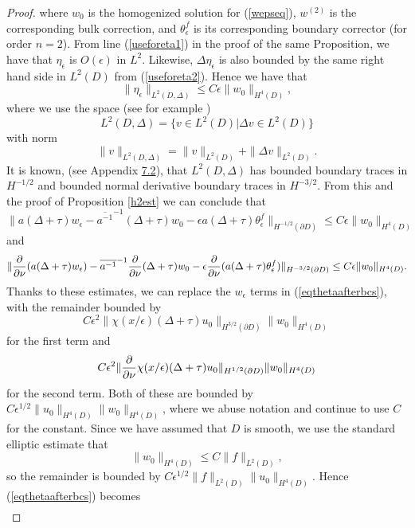 \documentclass[10pt,a4paper]{amsart}
\begin{document}
\begin{proof}
where $w_0$ is the homogenized solution for (\ref{wepseq}), $w^{(2)}$ is the corresponding bulk correction, and $\theta^f_\epsilon$ is its corresponding boundary corrector (for order $n=2$). 
From line (\ref{useforeta1}) in the proof of the same Proposition, we have that $\eta_\epsilon$ is $O(\epsilon)$ in $L^2$. Likewise, $ \Delta \eta_\epsilon $  is also  bounded by the same right hand side in $L^2(D)$ from (\ref{useforeta2}).  Hence we have that 
$$ \|  \eta_\epsilon \|_{L^2(D,\Delta)} \leq  C\epsilon \| w_0\|_{H^4( D)}, $$
where we use the space (see for example \cite{Va})  $$L^2(D, \Delta) = \{ v \in L^2(D)| \Delta v\in L^2(D)\}  $$ with norm $$ \| v\|_{L^2(D,\Delta)} = \|v\|_{L^2(D)} + \| \Delta v \|_{L^2(D)}.$$ It is known, (see Appendix \href{https://arxiv.org/abs/2508.21174v1}{7.2}), that $L^2(D,\Delta)$ has bounded boundary traces in $H^{-1/2}$ and bounded normal derivative boundary traces in $H^{-3/2}$. From this and the proof of Proposition \ref{h2est} we can conclude that 
\begin{equation}\label{hminushalfest} \|a (\Delta+\tau)w_\epsilon -\overline{a^{-1}}^{-1}(\Delta +\tau)w_0 -\epsilon a (\Delta+\tau)\theta^f_\epsilon \|_{H^{-1/2}(\partial D)} \leq C\epsilon \| w_0\|_{H^4( D)} \end{equation} and 
\begin{equation}\label{hminus3halfest} \| {\partial\over{\partial\nu}} (a(\Delta+\tau)w_\epsilon) -\overline{a^{-1}}^{-1}{\partial\over{\partial\nu}}(\Delta +\tau)w_0 -\epsilon {\partial\over{\partial\nu}} (a (\Delta+\tau)\theta^f_\epsilon) \|_{H^{-3/2}(\partial D)} \leq C\epsilon \| w_0\|_{H^4( D)}. \end{equation}
Thanks to these estimates, we can replace the $w_\epsilon$ terms in (\ref{eqthetaafterbcs}), with the remainder bounded by $$C \epsilon^2 \| \chi(x/\epsilon)(\Delta + \tau) u_0 \|_{H^{3/2}(\partial D)}   \| w_0\|_{H^4(D)}$$ for the first term and  $$ C \epsilon^2 \| {\partial\over{\partial\nu}}\chi(x/\epsilon)(\Delta + \tau) u_0 \|_{H^{1/2}(\partial D)}  \| w_0\|_{H^4(D)} $$  for the second term. Both of these are bounded by $ C\epsilon^{1/2} \| u_0\|_{H^4(D)} \| w_0\|_{H^4(D)}$, where we abuse notation and continue to use $C$ for the constant.  Since we have assumed that $D$ is smooth, we use the standard elliptic estimate that $$\| w_0\|_{H^4(D)}\leq C \| f \|_{L^2(D)},$$ so the remainder  is bounded by $C\epsilon^{1/2}\| f \|_{L^2(D)} \| u_0\| _{H^4(D)}$. Hence (\ref{eqthetaafterbcs}) becomes 
\begin{multline}\label{eqthetaafterreplacement}

\end{multline}
\end{proof}
\end{document}
